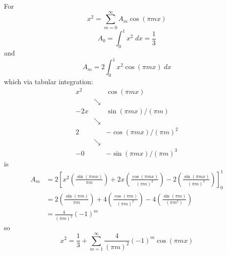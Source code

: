 \documentclass[12pt]{article}
\begin{document}
\begin{enumerate}
    \color{blue}
    For 
    \[x^2 = \sum_{m=0}^\infty A_m \cos(\pi mx)\]
    \[A_0 = \int_0^1 x^2 \;dx = \frac{1}{3}\]
    and 
    \[A_m = 2\int_0^1 x^2 \cos(\pi mx)\; dx\]
    which via tabular integration:
    \[\begin{array}{ccc}
        x^2 & & \cos(\pi mx)\\
        & \searrow & \\
        -2x & & \sin(\pi mx)/(\pi m)\\
        & \searrow & \\
        2 & & -\cos(\pi mx)/(\pi m)^2\\
        & \searrow & \\
        -0 & & -\sin(\pi mx)/(\pi m)^3 
    \end{array}\]
    is 
    \begin{align*}
        A_m &= 2\left[x^2 \left(\frac{\sin(\pi mx)}{\pi m}\right) + 2x\left(\frac{\cos(\pi mx)}{(\pi m)^2}\right) - 2\left(\frac{\sin(\pi mx)}{(\pi m)^3}\right)\right]_0^1\\
        &= 2\left(\frac{\sin(\pi m)}{\pi m}\right) + 4\left(\frac{\cos(\pi m)}{(\pi m)^2}\right) -4\left(\frac{\sin(\pi m)}{(\pi m^3)}\right)\\
        &= \frac{4}{(\pi m)^2} (-1)^m
    \end{align*}
    so 
    \[\boxed{x^2 = \frac{1}{3} + \sum_{m=1}^\infty \frac{4}{(\pi m)^2} (-1)^m \cos(\pi mx)}\]
    \color{black}
\end{enumerate}

\pagebreak
\end{document}
